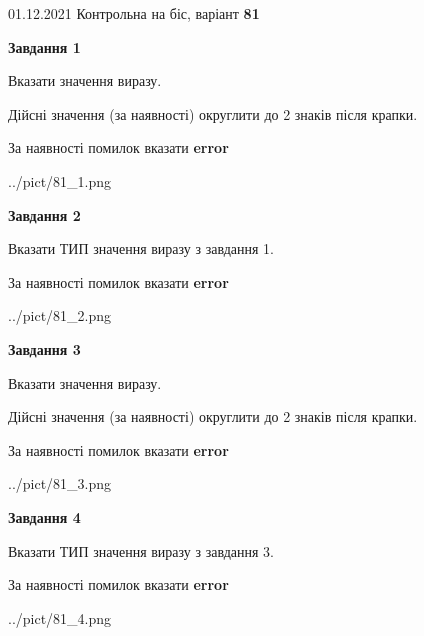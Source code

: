 \documentclass[11pt, ukrainian]{article}
\begin{document}
{01.12.2021 Контрольна на біс, варіант  \No \textbf { 81 }\par}
{
\begin {large}
{\begin {center}\textbf{Завдання 1}\end {center}}\par
Вказати значення виразу. \par
Дійсні значення (за наявності) округлити до 2 знаків після крапки. \par
За наявності помилок вказати \textbf{error}

\begin{center}
	{../pict/81_1.png}
\end{center}
\newpage

{\begin {center}\textbf{Завдання 2}\end {center}}\par
Вказати ТИП значення виразу з завдання 1. \par
За наявності помилок вказати \textbf{error}

\begin{center}
	{../pict/81_2.png}
\end{center}
\newpage

{\begin {center}\textbf{Завдання 3}\end {center}}\par
Вказати значення виразу. \par
Дійсні значення (за наявності) округлити до 2 знаків після крапки. \par
За наявності помилок вказати \textbf{error}

\begin{center}
	{../pict/81_3.png}
\end{center}
\newpage

{\begin {center}\textbf{Завдання 4}\end {center}}\par
Вказати ТИП значення виразу з завдання 3. \par
За наявності помилок вказати \textbf{error}

\begin{center}
	{../pict/81_4.png}
\end{center}
\newpage


\end{large}}
\end{document}
